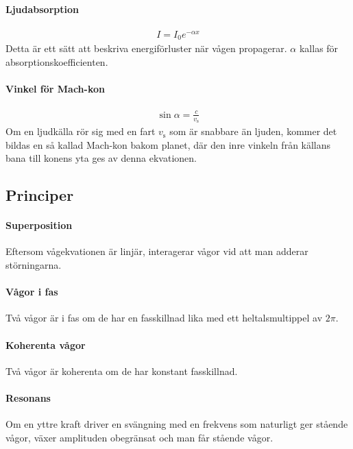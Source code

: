 \paragraph{Ljudabsorption}
\begin{align*}
	I = I_0e^{-\alpha x}
\end{align*}
Detta är ett sätt att beskriva energiförluster när vågen propagerar. $\alpha$ kallas för absorptionskoefficienten.

\paragraph{Vinkel för Mach-kon}
\begin{align*}
	\sin{\alpha} = \frac{c}{v_{\text{s}}}
\end{align*}
Om en ljudkälla rör sig med en fart $v_{\text{s}}$ som är snabbare än ljuden, kommer det bildas en så kallad Mach-kon bakom planet, där den inre vinkeln från källans bana till konens yta ges av denna ekvationen.

\deriv

\subsection{Principer}

\paragraph{Superposition}
Eftersom vågekvationen är linjär, interagerar vågor vid att man adderar störningarna.

\paragraph{Vågor i fas}
Två vågor är i fas om de har en fasskillnad lika med ett heltalsmultippel av $2\pi$.

\paragraph{Koherenta vågor}
Två vågor är koherenta om de har konstant fasskillnad.

\paragraph{Resonans}
Om en yttre kraft driver en svängning med en frekvens som naturligt ger stående vågor, växer amplituden obegränsat och man får stående vågor.